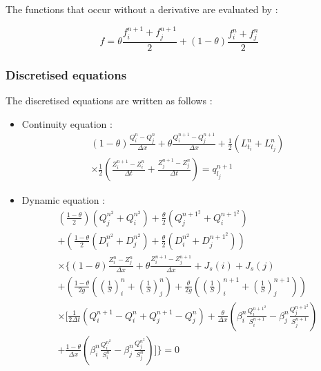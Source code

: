 The functions that occur without a derivative are evaluated by :

\begin{equation}
  f = \theta \frac{f_{i}^{n+1} + f_{j}^{n+1}}{2} + (1 - \theta) \frac{f_{i}^n + f_{j}^n}{2}
\end{equation}

\subsubsection{Discretised equations}

The discretised equations are written as follows :

\begin{itemize}
  \item Continuity equation :
  \begin{eqnarray}
    (1 - \theta) \frac{Q_{i}^n - Q_{j}^n}{\Delta x} + \theta \frac{Q_{i}^{n+1} - Q_{j}^{n+1}}{\Delta x} + \frac{1}{2} \left ( L_{t_i}^n + L_{t_j}^n \right ) \nonumber \\
    \times \frac{1}{2} \left ( \frac{Z_{i}^{n+1} - Z_{i}^n}{\Delta t} + \frac{Z_{j}^{n+1} - Z_{j}^n}{\Delta t} \right ) = q_{l_j}^{n+1}
  \end{eqnarray}

  \item Dynamic equation :
  \begin{eqnarray}
    \left ( \frac{1 - \theta }{2} \right ) \left ( Q_{j}^{n^2} + Q_{i}^{n^2} \right ) + \frac{\theta}{2} \left ( Q_{j}^{n+1^2} + Q_{i}^{n+1^2} \right ) \nonumber \\
    + \left ( \frac{1 - \theta}{2} \left ( D_{i}^{n^2} + D_{j}^{n^2} \right ) + \frac{\theta}{2} \left ( D_{i}^{n^2} + D_{j}^{n+1^2} \right ) \right ) \nonumber \\
    \times \Bigg \{ (1 - \theta) \frac{Z_{i}^n - Z_{j}^n}{\Delta x} + \theta \frac{Z_{i}^{n+1} - Z_{j}^{n+1}}{\Delta x} + J_{s}(i) + J_{s}(j) \nonumber \\
    + \left ( \frac{1 - \theta}{2 g} \left ( \left ( \frac{1}{S} \right )_{i}^n + \left ( \frac{1}{S} \right )_{j}^n \right ) + \frac{\theta}{2 g} \left ( \left ( \frac{1}{S} \right )_{i}^{n+1} + \left ( \frac{1}{S} \right )_{j}^{n+1} \right ) \right ) \nonumber \\
    \times \Bigg [ \frac{1}{2 \Delta t}(Q_{i}^{n+1}-Q_{i}^n+Q_{j}^{n+1}-Q_{j}^n) + \frac{\theta}{\Delta x} \left ( \beta_{i}^n \frac{Q_{i}^{n+1^2}}{S_{i}^{n+1}}-\beta_{j}^n \frac{Q_{j}^{n+1^2}}{S_{j}^{n+1}} \right ) \nonumber \\
    + \frac{1-\theta}{\Delta x} \left ( \beta_{i}^n \frac{Q_{i}^{n^2}}{S_{i}^{n}}-\beta_{j}^n \frac{Q_{j}^{n^2}}{S_{j}^{n}} \right ) \Bigg ] \Bigg \} = 0
  \end{eqnarray}
\end{itemize}

